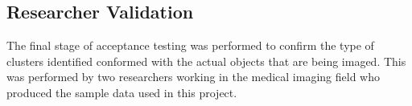 \subsection{Researcher Validation}
\label{sub:researcher_validation}

The final stage of acceptance testing was performed to confirm the type of
clusters identified conformed with the actual objects that are being imaged.
This was performed by two researchers working in the medical imaging field who
produced the sample data used in this project.
